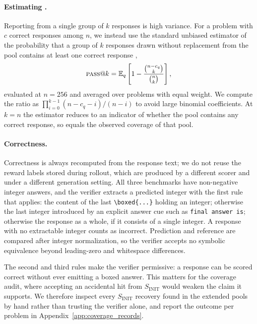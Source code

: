 \paragraph{Estimating .}
Reporting  from a single group of $k$ responses is high variance. For a
problem with $c$ correct responses among $n$, we instead use the standard
unbiased estimator of the probability that a group of $k$ responses drawn
without replacement from the pool contains at least one correct response
\citep{chen2021evaluating},
\begin{equation}
    \textsc{pass}@k
    =
    \mathbb{E}_{q}
    \left[
        1-\frac{\binom{n-c_q}{k}}{\binom{n}{k}}
    \right],
    \label{eq:pass_at_k}
\end{equation}
evaluated at $n=256$ and averaged over problems with equal weight. We compute
the ratio as $\prod_{i=0}^{k-1}(n-c_q-i)/(n-i)$ to avoid large binomial
coefficients. At $k=n$ the estimator reduces to an indicator of whether the pool
contains any correct response, so  equals the observed coverage of
that pool.

\paragraph{Correctness.}
Correctness is always recomputed from the response text; we do not reuse the
reward labels stored during rollout, which are produced by a different scorer
and under a different generation setting. All three benchmarks have
non-negative integer answers, and the verifier extracts a predicted integer with
the first rule that applies: the content of the last \verb|\boxed{...}| holding
an integer; otherwise the last integer introduced by an explicit answer cue such
as \texttt{final answer is}; otherwise the response as a whole, if it consists
of a single integer. A response with no extractable integer counts as incorrect.
Prediction and reference are compared after integer normalization, so the
verifier accepts no symbolic equivalence beyond leading-zero and whitespace
differences.

The second and third rules make the verifier permissive: a response can be
scored correct without ever emitting a boxed answer. This matters for the
coverage audit, where accepting an accidental hit from $S_{\mathrm{INIT}}$ would
weaken the claim it supports. We therefore inspect every
$S_{\mathrm{INIT}}$ recovery found in the extended pools by hand rather than
trusting the verifier alone, and report the outcome per problem in
Appendix~\ref{app:coverage_records}.

